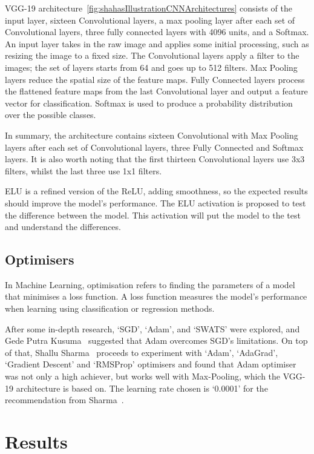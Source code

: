 \documentclass[conference]{IEEEtran}
\begin{document}
        VGG-19 architecture~\ref{fig:shahasIllustrationCNNArchitectures} consists of the input layer, sixteen Convolutional layers, a max pooling layer after each set of Convolutional layers, three fully connected layers with 4096 units, and a Softmax. An input layer takes in the raw image and applies some initial processing, such as resizing the image to a fixed size. The Convolutional layers apply a filter to the images; the set of layers starts from 64 and goes up to 512 filters. Max Pooling layers reduce the spatial size of the feature maps. Fully Connected layers process the flattened feature maps from the last Convolutional layer and output a feature vector for classification. Softmax is used to produce a probability distribution over the possible classes. 

        In summary, the architecture contains sixteen Convolutional with Max Pooling layers after each set of Convolutional layers, three Fully Connected and Softmax layers. It is also worth noting that the first thirteen Convolutional layers use 3x3 filters, whilst the last three use 1x1 filters.

        ELU is a refined version of the ReLU, adding smoothness, so the expected results should improve the model's performance. The ELU activation is proposed to test the difference between the model. This activation will put the model to the test and understand the differences.

      \subsection{Optimisers}
        In Machine Learning, optimisation refers to finding the parameters of a model that minimises a loss function. A loss function measures the model's performance when learning using classification or regression methods. 
          
        After some in-depth research, `SGD', `Adam', and `SWATS' were explored, and Gede Putra Kusuma~\cite{kusuma_emotion_2020} suggested that Adam overcomes SGD's limitations. On top of that, Shallu Sharma~\cite{sharma_optimised_2021} proceeds to experiment with `Adam', `AdaGrad', `Gradient Descent' and `RMSProp' optimisers and found that Adam optimiser was not only a high achiever, but works well with Max-Pooling, which the VGG-19 architecture is based on. The learning rate chosen is `0.0001' for the recommendation from Sharma~\cite{sharma_optimised_2021}.

    \section{Results}
\end{document}
